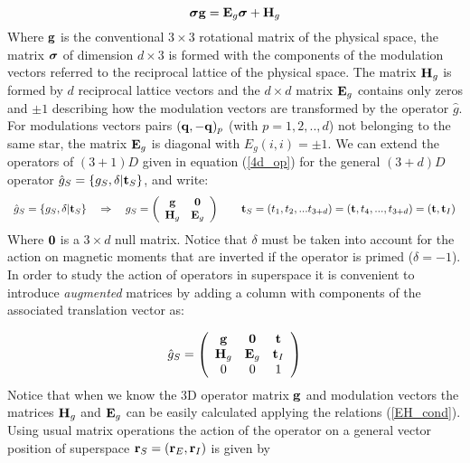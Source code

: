 \documentclass[10pt]{article}
\newcommand{\bfsigma}{\mbox{\boldmath$\sigma$}}
\begin{document}
\begin{equation} \label{EH_cond}
{\bfsigma} {\bf g}= {\bf E}_g {\bfsigma} + {\bf H}_g
\end{equation}
Where $	{\bf g}$ is the conventional $3\times3$ rotational matrix of the physical space, the matrix $\bfsigma$ of dimension $d \times 3$ is formed with the components of the modulation vectors referred to the reciprocal lattice of the physical space. The matrix ${\bf H}_g$ is formed by $d$ reciprocal lattice vectors and the $d \times d$  matrix ${\bf E}_g$ contains only zeros and $\pm 1$ describing how the modulation vectors are transformed by the operator $\hat g$. For modulations vectors pairs $({\bf q},-{\bf q})_p$ (with $p=1,2,..,d$) not belonging to the same star, the matrix ${\bf E}_g$ is diagonal with $E_g(i,i)=\pm1$. 
We can extend the operators of $(3+1)D$ given in equation (\ref{4d_op}) for the general $(3+d)D$ operator  $\hat g_S =\{g_S,\delta|{\bf t}_S \}$, and write:
\begin{equation}
\begin{array} {l}
\hat g_S=\{{g}_S,\delta|{\bf t}_S\} \quad \Rightarrow  \quad  {g}_S = \left( {\begin{array}{*{20}{c}}
	{\bf g}&{\bf 0}\\
	{{\bf H}_g}&{{\bf E}_g}
	\end{array}} \right)\quad \quad {{\bf t}_S} = ({t_1},{t_2},...{t_{3+d}})=({\bf t},t_4,...,t_{3+d})=({\bf t},{\bf t}_I)
\end{array}
\end{equation}
Where ${\bf 0}$ is a $3 \times d$ null matrix. Notice that $\delta$ must be taken into account for the action on magnetic moments that are inverted if the operator is primed ($\delta=-1$).
In order to study the action of operators in superspace it is convenient to introduce {\it augmented} matrices by adding a column with components of the associated translation vector as:

\begin{equation} \label{augmented_matrix}
\begin{array} {l}
{\hat g}_S = \left( {\begin{array}{*{20}{c}}
	{\bf g}    &{\bf 0}    &{\bf t}\\
	{{\bf H}_g}&{{\bf E}_g}&{\bf t}_I\\
	{0}     &{0}        &{1}
	\end{array}} \right)
\end{array}
\end{equation}
Notice that when we know the 3D operator matrix ${\bf g}$ and modulation vectors the matrices ${\bf H}_g$ and ${\bf E}_g$ can be easily calculated applying the relations (\ref{EH_cond}).  Using usual matrix operations the action of the operator on a general vector position of superspace ${\bf r}_S =({\bf r}_E,{\bf r}_I)$ is given by
\end{document}
